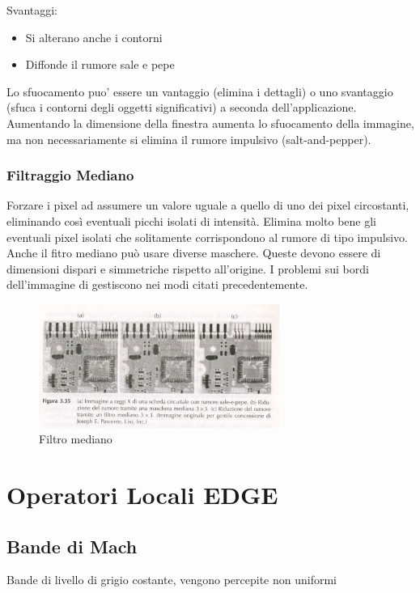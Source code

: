 \documentclass[12pt]{article}
\begin{document}
Svantaggi:
\begin{itemize}
    \item Si alterano anche i contorni
    \item Diffonde il rumore sale e pepe
\end{itemize}

Lo sfuocamento puo’ essere un vantaggio (elimina i dettagli) o uno svantaggio (sfuca i contorni degli oggetti significativi) a seconda dell'applicazione.
Aumentando la dimensione della finestra aumenta lo sfuocamento della immagine, ma non necessariamente si elimina il rumore impulsivo (salt-and-pepper).
\subsubsection{Filtraggio Mediano}
Forzare i pixel ad assumere un valore uguale a quello di uno dei pixel circostanti, eliminando così eventuali picchi isolati di intensità. Elimina molto bene gli eventuali pixel isolati che solitamente corrispondono al rumore di tipo impulsivo.
Anche il fitro mediano può usare diverse maschere. Queste devono essere di
dimensioni dispari e simmetriche rispetto all’origine. I problemi sui bordi dell’immagine di gestiscono nei modi citati precedentemente. \\
\begin{figure}[!htb]
    \centering
    \includegraphics[width=0.7\textwidth]{Images/mediano.png}
    \caption{Filtro mediano}
\end{figure}
\FloatBarrier
\newpage
\section{Operatori Locali EDGE}
\subsection{Bande di Mach}
Bande di livello di grigio costante, vengono percepite non uniformi
\end{document}
